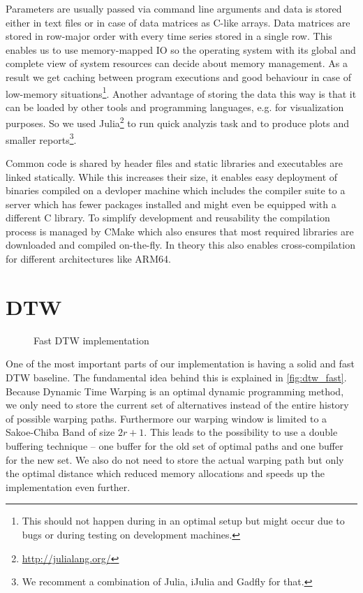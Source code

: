 Parameters are usually passed via command line arguments and data is stored either in text files or in case of data matrices as C-like arrays. Data matrices are stored in row-major order with every time series stored in a single row. This enables us to use memory-mapped IO so the operating system with its global and complete view of system resources can decide about memory management. As a result we get caching between program executions and good behaviour in case of low-memory situations\footnote{This should not happen during in an optimal setup but might occur due to bugs or during testing on development machines.}. Another advantage of storing the data this way is that it can be loaded by other tools and programming languages, e.g. for visualization purposes. So we used Julia\footnote{\url{http://julialang.org/}} to run quick analyzis task and to produce plots and smaller reports\footnote{We recomment a combination of Julia, iJulia and Gadfly for that.}.

Common code is shared by header files and static libraries and executables are linked statically. While this increases their size, it enables easy deployment of binaries compiled on a devloper machine which includes the compiler suite to a server which has fewer packages installed and might even be equipped with a different C library. To simplify development and reusability the compilation process is managed by CMake which also ensures that most required libraries are downloaded and compiled on-the-fly. In theory this also enables cross-compilation for different architectures like ARM64.



\section{DTW}
\label{sec:implementation:dtw}

\begin{figure}
    \centering
    
    \caption{Fast DTW implementation}
    \label{fig:dtw_fast}
\end{figure}

One of the most important parts of our implementation is having a solid and fast DTW baseline. The fundamental idea behind this is explained in \autoref{fig:dtw_fast}. Because Dynamic Time Warping is an optimal dynamic programming method, we only need to store the current set of alternatives instead of the entire history of possible warping paths. Furthermore our warping window is limited to a Sakoe-Chiba Band of size $2r + 1$. This leads to the possibility to use a double buffering technique -- one buffer for the old set of optimal paths and one buffer for the new set. We also do not need to store the actual warping path but only the optimal distance which reduced memory allocations and speeds up the implementation even further.

